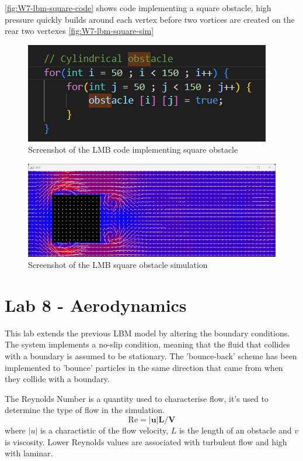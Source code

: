 \autoref{fig:W7-lbm-square-code} shows code implementing a square obstacle, high pressure quickly builds around each vertex before two vortices are created on the rear two vertexes \autoref{fig:W7-lbm-square-sim}  
\begin{figure}[H] 
    \centering
    \includegraphics[width=0.49\columnwidth]{Figures/Week 7/square code.png}
    \caption{Screenshot of the LMB code implementing square obstacle}
    \label{fig:W7-lbm-square-code}
\end{figure}
\begin{figure}[H] 
    \centering
    \includegraphics[width=0.49\columnwidth]{Figures/Week 7/square run.png}
    \caption{Screenshot of the LMB square obstacle simulation}
    \label{fig:W7-lbm-square-sim}
\end{figure}
\newpage
\section{Lab 8 - Aerodynamics}
This lab extends the previous LBM model by altering the boundary conditions. The system implements a no-slip condition, meaning that the fluid that collides with a boundary is assumed to be stationary. The 'bounce-back' scheme has been implemented to 'bounce' particles in the same direction that came from when they collide with a boundary.   

The Reynolds Number is a quantity used to characterise flow, it's used to determine the type of flow in the simulation. 
\[\mathrm{Re} = \mathbf{|u|}  \mathbf{L} \mathbf{/V}\]
where $|u|$ is a charactistic of the flow velocity, $L$ is the length of an obstacle and $v$ is viscosity.
Lower Reynolds values are associated with turbulent flow and high with laminar. 

